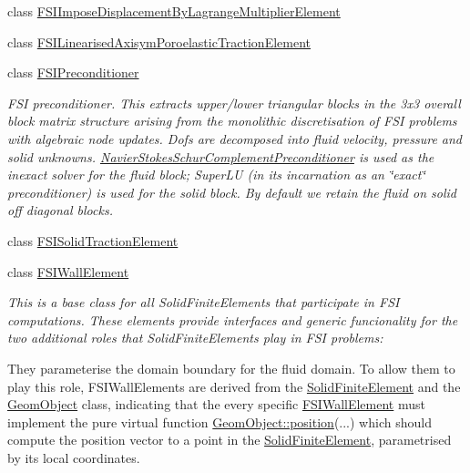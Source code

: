 \begin{DoxyCompactItemize}
\item 
class \hyperlink{classoomph_1_1FSIImposeDisplacementByLagrangeMultiplierElement}{F\+S\+I\+Impose\+Displacement\+By\+Lagrange\+Multiplier\+Element}
\item 
class \hyperlink{classoomph_1_1FSILinearisedAxisymPoroelasticTractionElement}{F\+S\+I\+Linearised\+Axisym\+Poroelastic\+Traction\+Element}
\item 
class \hyperlink{classoomph_1_1FSIPreconditioner}{F\+S\+I\+Preconditioner}
\begin{DoxyCompactList}\small\item\em F\+SI preconditioner. This extracts upper/lower triangular blocks in the 3x3 overall block matrix structure arising from the monolithic discretisation of F\+SI problems with algebraic node updates. Dofs are decomposed into fluid velocity, pressure and solid unknowns. \hyperlink{classoomph_1_1NavierStokesSchurComplementPreconditioner}{Navier\+Stokes\+Schur\+Complement\+Preconditioner} is used as the inexact solver for the fluid block; Super\+LU (in its incarnation as an \char`\"{}exact\char`\"{} preconditioner) is used for the solid block. By default we retain the fluid on solid off diagonal blocks. \end{DoxyCompactList}\item 
class \hyperlink{classoomph_1_1FSISolidTractionElement}{F\+S\+I\+Solid\+Traction\+Element}
\item 
class \hyperlink{classoomph_1_1FSIWallElement}{F\+S\+I\+Wall\+Element}
\begin{DoxyCompactList}\small\item\em This is a base class for all Solid\+Finite\+Elements that participate in F\+SI computations. These elements provide interfaces and generic funcionality for the two additional roles that Solid\+Finite\+Elements play in F\+SI problems\+:
\begin{DoxyEnumerate}
\item They parameterise the domain boundary for the fluid domain. To allow them to play this role, F\+S\+I\+Wall\+Elements are derived from the \hyperlink{classoomph_1_1SolidFiniteElement}{Solid\+Finite\+Element} and the \hyperlink{classoomph_1_1GeomObject}{Geom\+Object} class, indicating that the every specific \hyperlink{classoomph_1_1FSIWallElement}{F\+S\+I\+Wall\+Element} must implement the pure virtual function \hyperlink{classoomph_1_1GeomObject_a0d04c9d4667817f3ef24bb660fd56065}{Geom\+Object\+::position}(...) which should compute the position vector to a point in the \hyperlink{classoomph_1_1SolidFiniteElement}{Solid\+Finite\+Element}, parametrised by its local coordinates.

\end{DoxyEnumerate}
\end{DoxyCompactList}
\end{DoxyCompactItemize}
